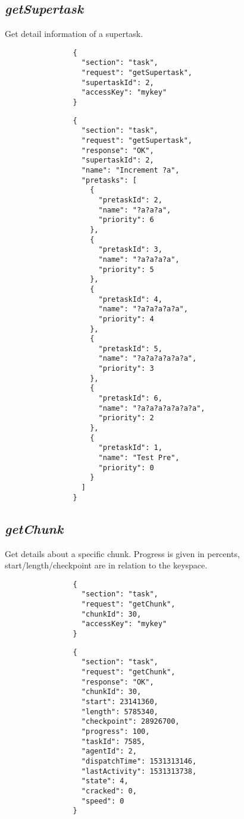 \documentclass{article}
\begin{document}
		\subsection*{\textit{getSupertask}}
			Get detail information of a supertask.
			{
				\color{blue}
				\begin{verbatim}
				{
				  "section": "task",
				  "request": "getSupertask",
				  "supertaskId": 2,
				  "accessKey": "mykey"
				}
				\end{verbatim}
			}
			{
				\color{OliveGreen}
				\begin{verbatim}
				{
				  "section": "task",
				  "request": "getSupertask",
				  "response": "OK",
				  "supertaskId": 2,
				  "name": "Increment ?a",
				  "pretasks": [
				    {
				      "pretaskId": 2,
				      "name": "?a?a?a",
				      "priority": 6
				    },
				    {
				      "pretaskId": 3,
				      "name": "?a?a?a?a",
				      "priority": 5
				    },
				    {
				      "pretaskId": 4,
				      "name": "?a?a?a?a?a",
				      "priority": 4
				    },
				    {
				      "pretaskId": 5,
				      "name": "?a?a?a?a?a?a",
				      "priority": 3
				    },
				    {
				      "pretaskId": 6,
				      "name": "?a?a?a?a?a?a?a",
				      "priority": 2
				    },
				    {
				      "pretaskId": 1,
				      "name": "Test Pre",
				      "priority": 0
				    }
				  ]
				}
				\end{verbatim}
			}
		\subsection*{\textit{getChunk}}
			Get details about a specific chunk. Progress is given in percents, start/length/checkpoint are in relation to the keyspace.
			{
				\color{blue}
				\begin{verbatim}
				{
				  "section": "task",
				  "request": "getChunk",
				  "chunkId": 30,
				  "accessKey": "mykey"
				}
				\end{verbatim}
			}
			{
				\color{OliveGreen}
				\begin{verbatim}
				{
				  "section": "task",
				  "request": "getChunk",
				  "response": "OK",
				  "chunkId": 30,
				  "start": 23141360,
				  "length": 5785340,
				  "checkpoint": 28926700,
				  "progress": 100,
				  "taskId": 7585,
				  "agentId": 2,
				  "dispatchTime": 1531313146,
				  "lastActivity": 1531313738,
				  "state": 4,
				  "cracked": 0,
				  "speed": 0
				}
				\end{verbatim}
			}
\end{document}
